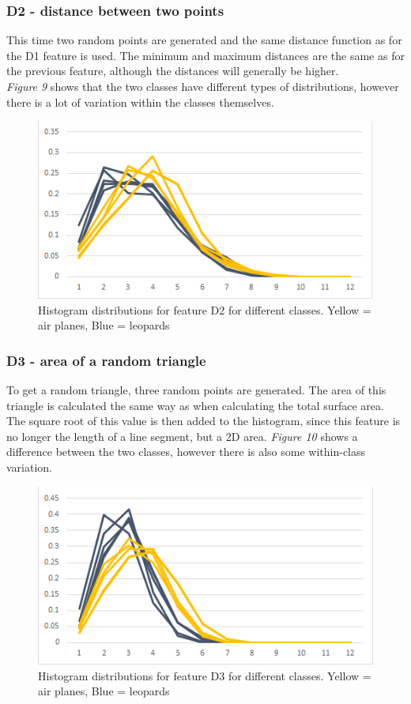 \documentclass{bigdata}
\begin{document}
\subsubsection{D2 - distance between two points}
This time two random points are generated and the same distance function as for the D1 feature is used. The minimum and maximum distances are the same as for the previous feature, although the distances will generally be higher. \\
\textit{Figure 9} shows that the two classes have different types of distributions, however there is a lot of variation within the classes themselves.
\begin{figure}[h!]
\begin{center}
    \includegraphics[width=0.7\linewidth]{Pictures/Part3/D2.png}
    \caption{Histogram distributions for feature D2 for different classes. Yellow = air planes, Blue = leopards}
  \label{fig:eccentricity}
\end{center}
\end{figure}

\subsubsection{D3 - area of a random triangle}
To get a random triangle, three random points are generated. The area of this triangle is calculated the same way as when calculating the total surface area. The square root of this value is then added to the histogram, since this feature is no longer the length of a line segment, but a 2D area.
\textit{Figure 10} shows a difference between the two classes, however there is also some within-class variation. 

\begin{figure}[h!]	
\begin{center}
    \includegraphics[width=0.7\linewidth]{Pictures/Part3/D3.png}
    \caption{Histogram distributions for feature D3 for different classes. Yellow = air planes, Blue = leopards}
  \label{fig:eccentricity}
\end{center}
\end{figure}
\newpage
\end{document}
